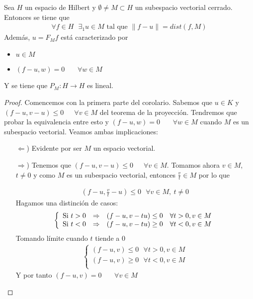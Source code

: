 \begin{coro}
    Sea $H$ un espacio de Hilbert y $\emptyset \neq M \subset H$ un subespacio vectorial cerrado. Entonces se tiene que 
    \begin{gather*}
        \forall f \in H \ \ \ \exists_1u\in M \text{ tal que } \|f-u\| = dist(f,M)
    \end{gather*}
    Además, $u=F_Mf$ está caracterizado por
    \begin{itemize}
        \item $u\in M$
        \item $(f-u, w) = 0$ \ \ \ $\forall w \in M$
    \end{itemize}

    Y se tiene que $P_M:H \to H$ es lineal.
    \begin{proof}
        Comencemos con la primera parte del corolario. Sabemos que $u\in K$ y $(f-u, v-u)\leq 0$\ \ \ $\forall v \in M$ del teorema de la proyección. Tendremos que probar la equivalencia entre esto y $(f-u, w) = 0$ \ \ \ $\forall w \in M$ cuando $M$ es un subespacio vectorial. Veamos ambas implicaciones:
        \begin{itemize}
            \item[$\Leftarrow$)] Evidente por ser $M$ un espacio vectorial.
            \item[$\Rightarrow$)] Tenemos que $(f-u, v-u)\leq 0$\ \ \ $\forall v \in M$. Tomamos ahora $v\in M$, $t\neq 0$ y como $M$ es un subespacio vectorial, entonces $\frac{v}{t}\in M$ por lo que
            
            \begin{gather*}
                (f-u, \frac{v}{t}-u) \leq 0 \ \ \ \forall v\in M, \ t\neq 0
            \end{gather*}
            Hagamos una distinción de casos:
            \begin{gather*}
                \left\{
                    \begin{array}{c c c}
                        \text{Si } t>0 & \Rightarrow  &(f-u,v-tu) \leq 0 \ \ \ \forall t>0, v\in M\\
                        \text{Si } t<0 & \Rightarrow  &(f-u,v-tu) \geq 0 \ \ \ \forall t<0, v\in M\\
                    \end{array}
                \right.
            \end{gather*}
            Tomando límite cuando $t$ tiende a $0$
            \begin{gather*}
                \left\{
                    \begin{array}{c}
                        (f-u,v) \leq 0 \ \ \ \forall t>0, v\in M\\
                        (f-u,v) \geq 0 \ \ \ \forall t<0, v\in M\\
                    \end{array}
                \right.
            \end{gather*}
            Y por tanto $(f-u,v) = 0$ \ \ \ $\forall v\in M$
        \end{itemize}


\end{proof}
\end{coro}
